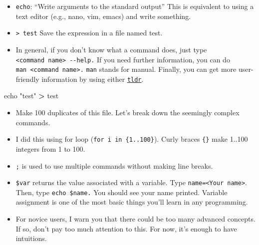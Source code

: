 \documentclass[
]{book}
\newenvironment{Shaded}{\begin{snugshade}}{\end{snugshade}}
\newcommand{\BuiltInTok}[1]{#1}
\newcommand{\ControlFlowTok}[1]{\textcolor[rgb]{0.13,0.29,0.53}{\textbf{#1}}}
\newcommand{\FunctionTok}[1]{\textcolor[rgb]{0.00,0.00,0.00}{#1}}
\newcommand{\KeywordTok}[1]{\textcolor[rgb]{0.13,0.29,0.53}{\textbf{#1}}}
\newcommand{\NormalTok}[1]{#1}
\newcommand{\OperatorTok}[1]{\textcolor[rgb]{0.81,0.36,0.00}{\textbf{#1}}}
\newcommand{\StringTok}[1]{\textcolor[rgb]{0.31,0.60,0.02}{#1}}
\newcommand{\VariableTok}[1]{\textcolor[rgb]{0.00,0.00,0.00}{#1}}
\providecommand{\tightlist}{%
  \setlength{\itemsep}{0pt}\setlength{\parskip}{0pt}}
\begin{document}
\begin{itemize}
\tightlist
\item
  \texttt{echo}: ``Write arguments to the standard output'' This is equivalent to using a text editor (e.g., nano, vim, emacs) and write something.
\item
  \texttt{\textgreater{}\ test} Save the expression in a file named test.\\
\item
  In general, if you don't know what a command does, just type \texttt{\textless{}command\ name\textgreater{}\ -\/-help.} If you need further information, you can do \texttt{man\ \textless{}command\ name\textgreater{}.} \texttt{man} stands for manual. Finally, you can get more user-friendly information by using either \href{https://tldr.sh/}{\texttt{tldr}}.
\end{itemize}

\begin{Shaded}
\begin{Highlighting}[]

\BuiltInTok{echo} \StringTok{"test"} \OperatorTok{\textgreater{}}\NormalTok{ test }
\end{Highlighting}
\end{Shaded}

\begin{itemize}
\tightlist
\item
  Make 100 duplicates of this file. Let's break down the seemingly complex commands.
\item
  I did this using for loop (\texttt{for\ i\ in\ \{1..100\}}). Curly braces \texttt{\{\}} make 1..100 integers from 1 to 100.\\
\item
  \texttt{;} is used to use multiple commands without making line breaks.
\item
  \texttt{\$var} returns the value associated with a variable. Type \texttt{name=\textless{}Your\ name\textgreater{}}. Then, type \texttt{echo\ \$name.} You should see your name printed. Variable assignment is one of the most basic things you'll learn in any programming.\\
\item
  For novice users, I warn you that there could be too many advanced concepts. If so, don't pay too much attention to this. For now, it's enough to have intuitions.
\end{itemize}

\begin{Shaded}
\end{Shaded}
\end{document}

